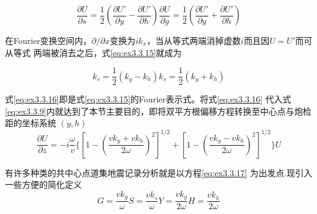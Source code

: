 \begin{subequations}
\begin{equation}
\frac{\partial U}{\partial s}=\frac{1}{2}(\frac{\partial U'}{\partial y}-\frac{\partial U'}{\partial h})
\label{eq:ex3.3.15a}
\end{equation}
\begin{equation}
\frac{\partial U}{\partial g}=\frac{1}{2}(\frac{\partial U'}{\partial y}+\frac{\partial U'}{\partial h})
\label{eq:ex3.3.15b}
\end{equation}
\label{eq:ex3.3.15}
\end{subequations}

在Fourier变换空间内，$\partial/\partial x$变换为$ik_x$，当从等式两端消掉虚数$i$而且因$U=U'$而可从等式
两端被消去之后，式\ref{eq:ex3.3.15}就成为

\begin{subequations}
\begin{equation}
k_s=\frac{1}{2}(k_y-k_h)
\label{eq:ex3.3.16a}
\end{equation}
\begin{equation}
k_s=\frac{1}{2}(k_y+k_h)
\label{eq:ex3.3.16b}
\end{equation}
\label{eq:ex3.3.16}
\end{subequations}

式\ref{eq:ex3.3.16}即是式\ref{eq:ex3.3.15}的Fourier表示式。将式\ref{eq:ex3.3.16}
代入式\ref{eq:ex3.3.9}内就达到了本节主要目的，即将双平方根偏移方程转换至中心点与炮检距的坐标系统
$(y,h)$
\begin{equation}
\frac{\partial U}{\partial z}=-i\frac{\omega}{v} \{
[1-(\frac{vk_y+vk_h}{2\omega})^2]^{1/2}+
[1-(\frac{vk_y-vk_h}{2\omega})^2]^{1/2}
\}U
\label{eq:ex3.3.17}
\end{equation}

有许多种类的共中心点道集地震记录分析就是以方程\ref{eq:ex3.3.17}
为出发点.现引入一些方便的简化定义
\begin{subequations}
\begin{equation}
G=\frac{vk_g}{\omega}
\label{eq:ex3.3.18a}
\end{equation}
\begin{equation}
S=\frac{vk_s}{\omega}
\label{eq:ex3.3.18b}
\end{equation}
\begin{equation}
Y=\frac{vk_y}{2\omega}
\label{eq:ex3.3.18c}
\end{equation}
\begin{equation}
H=\frac{vk_h}{2\omega}
\label{eq:ex3.3.18d}
\end{equation}
\end{subequations}

